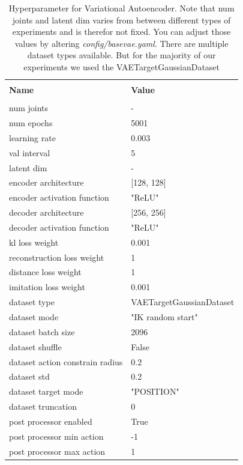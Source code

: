 \begin{table}[h]
    \label{tab:VAE_Hyperparameters}
    \begin{center}
        \begin{tabular}{ l | l }
        \hline \\
        \textbf{Name} & \textbf{Value} \\
        \hline \\
        num joints & - \\
        num epochs & 5001 \\
        learning rate & 0.003 \\
        val interval & 5 \\
        latent dim & - \\
        encoder architecture & [128, 128] \\
        encoder activation function & "ReLU" \\
        decoder architecture & [256, 256] \\
        decoder activation function & "ReLU" \\
        kl loss weight & 0.001 \\
        reconstruction loss weight & 1 \\
        distance loss weight & 1 \\
        imitation loss weight & 0.001 \\
        dataset type & VAETargetGaussianDataset \\
        dataset mode & "IK random start" \\
        dataset batch size & 2096 \\
        dataset shuffle & False \\
        dataset action constrain radius & 0.2 \\
        dataset std & 0.2 \\
        dataset target mode & "POSITION" \\
        dataset truncation & 0  \\
        post processor enabled & True \\
        post processor min action & -1 \\
        post processor max action & 1 
        \end{tabular}
    \end{center}
    \caption[VAE Hyperparameter]{Hyperparameter for Variational Autoencoder. Note that num joints and latent dim varies from between different types of experiments and is therefor not fixed. You can adjust those values by altering \textit{config/base\textunderscore vae.yaml}. There are multiple dataset types available. But for the majority of our experiments we used the VAETargetGaussianDataset}
\end{table}

